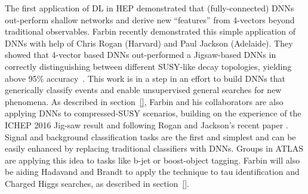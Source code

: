 
The first application of DL in HEP demonstrated that (fully-connected)
DNNs out-perform shallow networks and derive new ``features'' from
4-vectors beyond traditional observables. Farbin recently demonstrated
this simple application of DNNs with help of Chris Rogan (Harvard) and
Paul Jackson (Adelaide). They showed that 4-vector based DNNs
out-performed a Jigsaw-based DNNs in correctly distinguishing between
different SUSY-like decay topologies, yielding above 95\%
accuracy~\cite{}. This work is in a step in an effort to build DNNs
that generically classify events and enable unsupervised general
searches for new phenomena. As described in section~\ref{}, Farbin and
his collaborators are also applying DNNs to compressed-SUSY scenarios,
building on the experience of the ICHEP 2016 Jig-saw result and
following Rogan and Jackson's recent paper \cite{}. Signal and
background classification tasks are the first and simplest and can be
easily enhanced by replacing traditional classifiers with DNNs. Groups
in ATLAS are applying this idea to tasks like b-jet or boost-object
tagging. Farbin will also be aiding Hadavand and Brandt to apply the
technique to tau identification and Charged Higgs searches, as
described in section~\ref{}.



